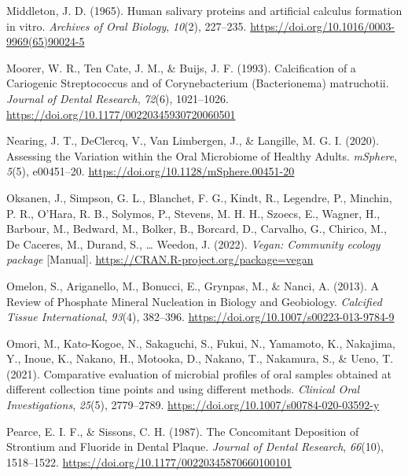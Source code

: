 \documentclass[
]{article}
\newlength{\cslhangindent}
\newlength{\cslentryspacingunit} %
\newenvironment{CSLReferences}[2] %
 {%
  \setlength{\parindent}{0pt}
  \ifodd #1
  \let\oldpar\par
  \def\par{\hangindent=\cslhangindent\oldpar}
  \fi
  \setlength{\parskip}{#2\cslentryspacingunit}
 }%
 {}
\begin{document}
\begin{CSLReferences}{1}{0}
\leavevmode{}%
Middleton, J. D. (1965). Human salivary proteins and artificial calculus
formation in vitro. \emph{Archives of Oral Biology}, \emph{10}(2),
227--235. \url{https://doi.org/10.1016/0003-9969(65)90024-5}

\leavevmode{}%
Moorer, W. R., Ten Cate, J. M., \& Buijs, J. F. (1993). Calcification of
a {Cariogenic Streptococcus} and of {Corynebacterium} ({Bacterionema})
matruchotii. \emph{Journal of Dental Research}, \emph{72}(6),
1021--1026. \url{https://doi.org/10.1177/00220345930720060501}

\leavevmode{}%
Nearing, J. T., DeClercq, V., Van Limbergen, J., \& Langille, M. G. I.
(2020). Assessing the {Variation} within the {Oral Microbiome} of
{Healthy Adults}. \emph{mSphere}, \emph{5}(5), e00451--20.
\url{https://doi.org/10.1128/mSphere.00451-20}

\leavevmode{}%
Oksanen, J., Simpson, G. L., Blanchet, F. G., Kindt, R., Legendre, P.,
Minchin, P. R., O'Hara, R. B., Solymos, P., Stevens, M. H. H., Szoecs,
E., Wagner, H., Barbour, M., Bedward, M., Bolker, B., Borcard, D.,
Carvalho, G., Chirico, M., De Caceres, M., Durand, S., \ldots{} Weedon,
J. (2022). \emph{Vegan: {Community} ecology package} {[}Manual{]}.
\url{https://CRAN.R-project.org/package=vegan}

\leavevmode{}%
Omelon, S., Ariganello, M., Bonucci, E., Grynpas, M., \& Nanci, A.
(2013). A {Review} of {Phosphate Mineral Nucleation} in {Biology} and
{Geobiology}. \emph{Calcified Tissue International}, \emph{93}(4),
382--396. \url{https://doi.org/10.1007/s00223-013-9784-9}

\leavevmode{}%
Omori, M., Kato-Kogoe, N., Sakaguchi, S., Fukui, N., Yamamoto, K.,
Nakajima, Y., Inoue, K., Nakano, H., Motooka, D., Nakano, T., Nakamura,
S., \& Ueno, T. (2021). Comparative evaluation of microbial profiles of
oral samples obtained at different collection time points and using
different methods. \emph{Clinical Oral Investigations}, \emph{25}(5),
2779--2789. \url{https://doi.org/10.1007/s00784-020-03592-y}

\leavevmode{}%
Pearce, E. I. F., \& Sissons, C. H. (1987). The {Concomitant Deposition}
of {Strontium} and {Fluoride} in {Dental Plaque}. \emph{Journal of
Dental Research}, \emph{66}(10), 1518--1522.
\url{https://doi.org/10.1177/00220345870660100101}


\end{CSLReferences}
\end{document}
